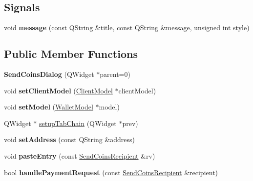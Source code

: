 \subsection*{Signals}
\begin{DoxyCompactItemize}
\item 
\mbox{\label{class_send_coins_dialog_ad3ef071070f1e52e10a2e88c0d0e7422}} 
void {\bfseries message} (const Q\+String \&title, const Q\+String \&message, unsigned int style)
\end{DoxyCompactItemize}
\subsection*{Public Member Functions}
\begin{DoxyCompactItemize}
\item 
\mbox{\label{class_send_coins_dialog_a0df5bc29d1df68eda44826651afc595f}} 
{\bfseries Send\+Coins\+Dialog} (Q\+Widget $\ast$parent=0)
\item 
\mbox{\label{class_send_coins_dialog_a360a23c02bd0e581b78603ccb863eb79}} 
void {\bfseries set\+Client\+Model} (\mbox{\hyperlink{class_client_model}{Client\+Model}} $\ast$client\+Model)
\item 
\mbox{\label{class_send_coins_dialog_a73a6c1b1850a334ee652ac167713a2aa}} 
void {\bfseries set\+Model} (\mbox{\hyperlink{class_wallet_model}{Wallet\+Model}} $\ast$model)
\item 
Q\+Widget $\ast$ \mbox{\hyperlink{class_send_coins_dialog_a689658987f2af0896f25bf37bb945d91}{setup\+Tab\+Chain}} (Q\+Widget $\ast$prev)
\item 
\mbox{\label{class_send_coins_dialog_a920b2dbf121ca3cfac2adc56e96295f8}} 
void {\bfseries set\+Address} (const Q\+String \&address)
\item 
\mbox{\label{class_send_coins_dialog_a4440d15ced5d217baaad33a17d56b409}} 
void {\bfseries paste\+Entry} (const \mbox{\hyperlink{class_send_coins_recipient}{Send\+Coins\+Recipient}} \&rv)
\item 
\mbox{\label{class_send_coins_dialog_a82ed6a3badadaa523415e1924ebd292a}} 
bool {\bfseries handle\+Payment\+Request} (const \mbox{\hyperlink{class_send_coins_recipient}{Send\+Coins\+Recipient}} \&recipient)
\end{DoxyCompactItemize}
